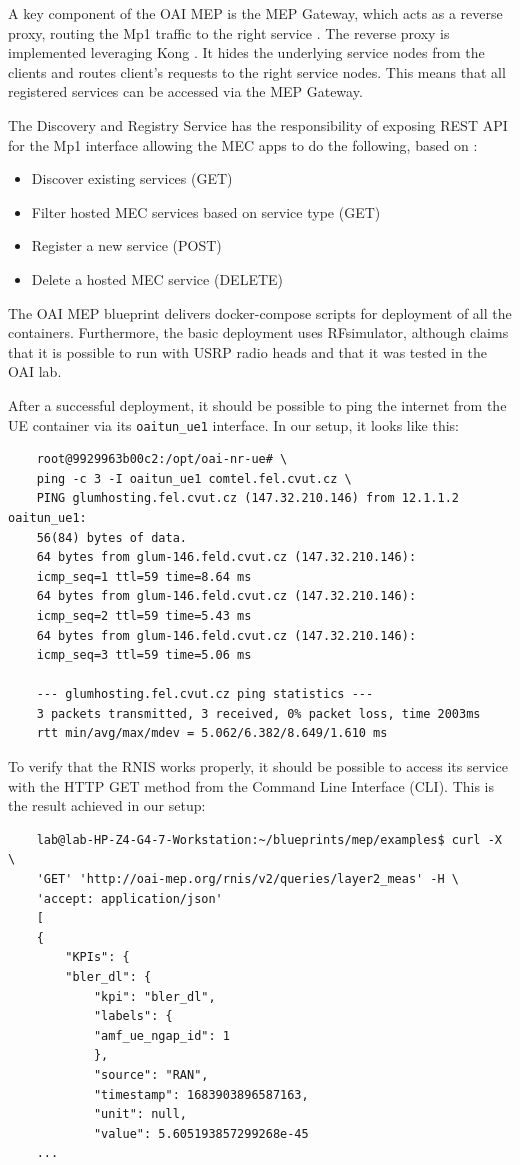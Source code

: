 \documentclass[12pt,a4paper,twoside]{report}
\begin{document}
A key component of the OAI MEP is the MEP Gateway, which acts as a reverse proxy, routing the Mp1 traffic to the right service \cite{oai-mep-git}. The reverse proxy is implemented leveraging Kong \cite{kong-docu}. It hides the underlying service nodes from the clients and routes client’s requests to the right service nodes. This means that all registered services can be accessed via the MEP Gateway.

The Discovery and Registry Service has the responsibility of exposing REST API for the Mp1 interface allowing the MEC apps to do the following, based on \cite{oai-mep-git}:
%
\begin{itemize}
	\item Discover existing services (GET)
	\item Filter hosted MEC services based on service type (GET)
	\item Register a new service (POST)
	\item Delete a hosted MEC service (DELETE)
\end{itemize}
%
The OAI MEP blueprint delivers docker-compose scripts for deployment of all the containers. Furthermore, the basic deployment uses RFsimulator, although \cite{oai-blueprint-git} claims that it is possible to run with USRP radio heads and that it was tested in the OAI lab. 

After a successful deployment, it should be possible to ping the internet from the UE container via its \verb|oaitun_ue1| interface. In our setup, it looks like this:
\begin{verbatim}
	root@9929963b00c2:/opt/oai-nr-ue# \
	ping -c 3 -I oaitun_ue1 comtel.fel.cvut.cz \
	PING glumhosting.fel.cvut.cz (147.32.210.146) from 12.1.1.2 oaitun_ue1:
	56(84) bytes of data.
	64 bytes from glum-146.feld.cvut.cz (147.32.210.146):
	icmp_seq=1 ttl=59 time=8.64 ms
	64 bytes from glum-146.feld.cvut.cz (147.32.210.146):
	icmp_seq=2 ttl=59 time=5.43 ms
	64 bytes from glum-146.feld.cvut.cz (147.32.210.146):
	icmp_seq=3 ttl=59 time=5.06 ms

	--- glumhosting.fel.cvut.cz ping statistics ---
	3 packets transmitted, 3 received, 0% packet loss, time 2003ms
	rtt min/avg/max/mdev = 5.062/6.382/8.649/1.610 ms
\end{verbatim}

To verify that the RNIS works properly, it should be possible to access its service with the HTTP GET method from the Command Line Interface (CLI). This is the result achieved in our setup:
\begin{verbatim}
	lab@lab-HP-Z4-G4-7-Workstation:~/blueprints/mep/examples$ curl -X \
	'GET' 'http://oai-mep.org/rnis/v2/queries/layer2_meas' -H \
	'accept: application/json'
	[
	{
		"KPIs": {
		"bler_dl": {
			"kpi": "bler_dl",
			"labels": {
			"amf_ue_ngap_id": 1
			},
			"source": "RAN",
			"timestamp": 1683903896587163,
			"unit": null,
			"value": 5.605193857299268e-45
	...
\end{verbatim}
\end{document}

